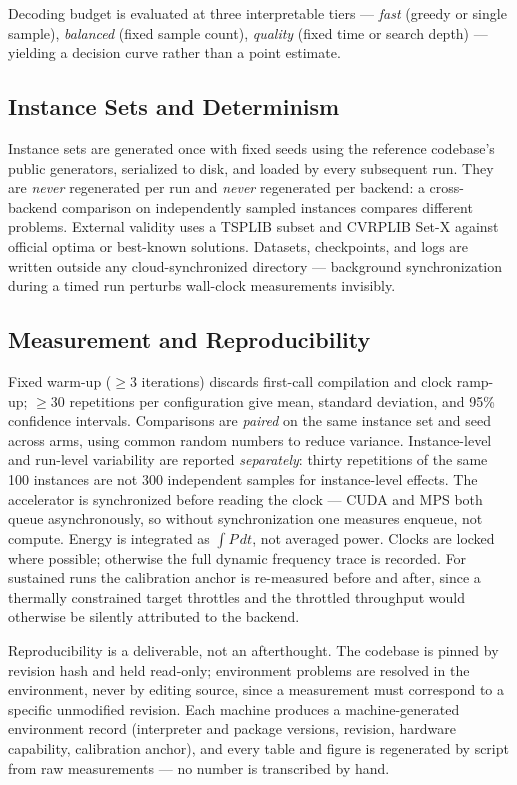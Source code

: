\documentclass[11pt,a4paper,twocolumn]{article}
\begin{document}
Decoding budget is evaluated at three interpretable tiers --- \emph{fast} (greedy or
single sample), \emph{balanced} (fixed sample count), \emph{quality} (fixed time or
search depth) --- yielding a decision curve rather than a point estimate.

\subsection{Instance Sets and Determinism}

Instance sets are generated once with fixed seeds using the reference codebase's
public generators, serialized to disk, and loaded by every subsequent run. They are
\emph{never} regenerated per run and \emph{never} regenerated per backend: a
cross-backend comparison on independently sampled instances compares different
problems. External validity uses a TSPLIB subset and CVRPLIB Set-X against official
optima or best-known solutions. Datasets, checkpoints, and logs are written outside
any cloud-synchronized directory --- background synchronization during a timed run
perturbs wall-clock measurements invisibly.

\subsection{Measurement and Reproducibility}

Fixed warm-up ($\ge 3$ iterations) discards first-call compilation and clock
ramp-up; $\ge 30$ repetitions per configuration give mean, standard deviation, and
95\% confidence intervals. Comparisons are \emph{paired} on the same instance set
and seed across arms, using common random numbers to reduce variance. Instance-level
and run-level variability are reported \emph{separately}: thirty repetitions of the
same 100 instances are not 300 independent samples for instance-level effects. The
accelerator is synchronized before reading the clock --- CUDA and MPS both queue
asynchronously, so without synchronization one measures enqueue, not compute. Energy
is integrated as $\int P\,dt$, not averaged power. Clocks are locked where possible;
otherwise the full dynamic frequency trace is recorded. For sustained runs the
calibration anchor is re-measured before and after, since a thermally constrained
target throttles and the throttled throughput would otherwise be silently attributed
to the backend.

Reproducibility is a deliverable, not an afterthought. The codebase is pinned by
revision hash and held read-only; environment problems are resolved in the
environment, never by editing source, since a measurement must correspond to a
specific unmodified revision. Each machine produces a machine-generated environment
record (interpreter and package versions, revision, hardware capability, calibration
anchor), and every table and figure is regenerated by script from raw measurements
--- no number is transcribed by hand.
\end{document}
